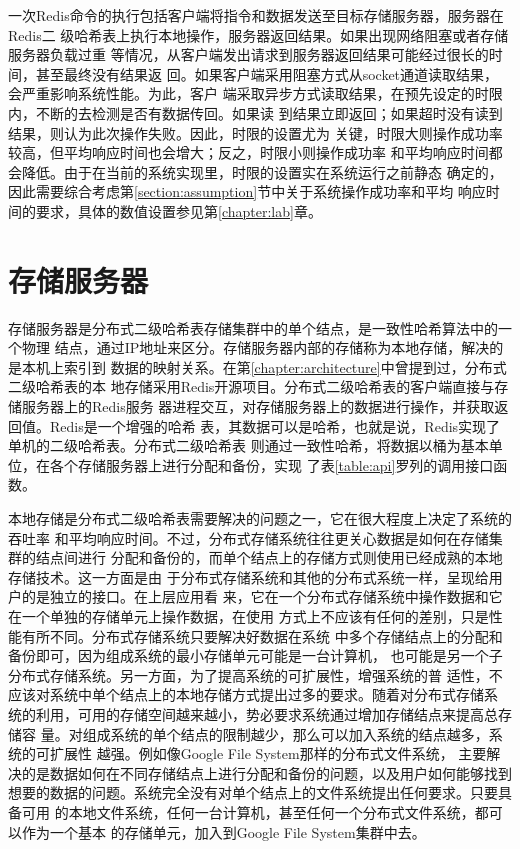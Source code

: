 一次Redis命令的执行包括客户端将指令和数据发送至目标存储服务器，服务器在Redis二
级哈希表上执行本地操作，服务器返回结果。如果出现网络阻塞或者存储服务器负载过重
等情况，从客户端发出请求到服务器返回结果可能经过很长的时间，甚至最终没有结果返
回。如果客户端采用阻塞方式从socket通道读取结果，会严重影响系统性能。为此，客户
端采取异步方式读取结果，在预先设定的时限内，不断的去检测是否有数据传回。如果读
到结果立即返回；如果超时没有读到结果，则认为此次操作失败。因此，时限的设置尤为
关键，时限大则操作成功率较高，但平均响应时间也会增大；反之，时限小则操作成功率
和平均响应时间都会降低。由于在当前的系统实现里，时限的设置实在系统运行之前静态
确定的，因此需要综合考虑第\ref{section:assumption}节中关于系统操作成功率和平均
响应时间的要求，具体的数值设置参见第\ref{chapter:lab}章。

\section{存储服务器}\label{section:redis}
存储服务器是分布式二级哈希表存储集群中的单个结点，是一致性哈希算法中的一个物理
结点，通过IP地址来区分。存储服务器内部的存储称为本地存储，解决的是本机上索引到
数据的映射关系。在第\ref{chapter:architecture}中曾提到过，分布式二级哈希表的本
地存储采用Redis开源项目。分布式二级哈希表的客户端直接与存储服务器上的Redis服务
器进程交互，对存储服务器上的数据进行操作，并获取返回值。Redis是一个增强的哈希
表，其数据可以是哈希，也就是说，Redis实现了单机的二级哈希表。分布式二级哈希表
则通过一致性哈希，将数据以桶为基本单位，在各个存储服务器上进行分配和备份，实现
了表\ref{table:api}罗列的调用接口函数。

本地存储是分布式二级哈希表需要解决的问题之一，它在很大程度上决定了系统的吞吐率
和平均响应时间。不过，分布式存储系统往往更关心数据是如何在存储集群的结点间进行
分配和备份的，而单个结点上的存储方式则使用已经成熟的本地存储技术。这一方面是由
于分布式存储系统和其他的分布式系统一样，呈现给用户的是独立的接口。在上层应用看
来，它在一个分布式存储系统中操作数据和它在一个单独的存储单元上操作数据，在使用
方式上不应该有任何的差别，只是性能有所不同。分布式存储系统只要解决好数据在系统
中多个存储结点上的分配和备份即可，因为组成系统的最小存储单元可能是一台计算机，
也可能是另一个子分布式存储系统。另一方面，为了提高系统的可扩展性，增强系统的普
适性，不应该对系统中单个结点上的本地存储方式提出过多的要求。随着对分布式存储系
统的利用，可用的存储空间越来越小，势必要求系统通过增加存储结点来提高总存储容
量。对组成系统的单个结点的限制越少，那么可以加入系统的结点越多，系统的可扩展性
越强。例如像Google File System\cite{ghemawat2003google}那样的分布式文件系统，
主要解决的是数据如何在不同存储结点上进行分配和备份的问题，以及用户如何能够找到
想要的数据的问题。系统完全没有对单个结点上的文件系统提出任何要求。只要具备可用
的本地文件系统，任何一台计算机，甚至任何一个分布式文件系统，都可以作为一个基本
的存储单元，加入到Google File System集群中去。

